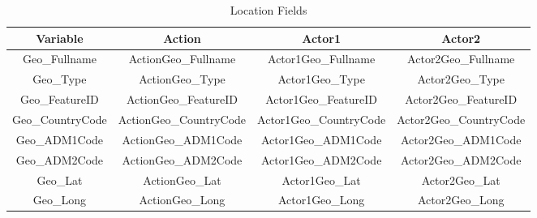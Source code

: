 \begin{table}[H]
\begin{center}
\caption{Location Fields} 
\label{table:GDELTLocationFields}
\begin{adjustbox}{max width=1.1\textwidth,center}
\begin{tabular}{| c | c | c | c |}
\hline
\textbf{Variable} & \textbf{Action} & \textbf{Actor1} & \textbf{Actor2} \\
\hline
Geo\_Fullname & ActionGeo\_Fullname & Actor1Geo\_Fullname & Actor2Geo\_Fullname \\
\hline
Geo\_Type & ActionGeo\_Type & Actor1Geo\_Type & Actor2Geo\_Type \\
\hline
Geo\_FeatureID & ActionGeo\_FeatureID & Actor1Geo\_FeatureID & Actor2Geo\_FeatureID \\
\hline
Geo\_CountryCode & ActionGeo\_CountryCode & Actor1Geo\_CountryCode & Actor2Geo\_CountryCode \\
\hline
Geo\_ADM1Code & ActionGeo\_ADM1Code & Actor1Geo\_ADM1Code & Actor2Geo\_ADM1Code \\
\hline
Geo\_ADM2Code & ActionGeo\_ADM2Code & Actor1Geo\_ADM2Code & Actor2Geo\_ADM2Code \\
\hline
Geo\_Lat & ActionGeo\_Lat & Actor1Geo\_Lat & Actor2Geo\_Lat \\
\hline
Geo\_Long & ActionGeo\_Long & Actor1Geo\_Long & Actor2Geo\_Long \\
\hline
\end{tabular}
\end{adjustbox}
\end{center}
\end{table}
		
